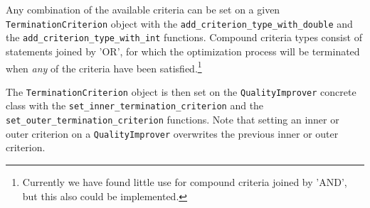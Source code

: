 Any combination of the available criteria can be set on a given
\texttt{TerminationCriterion} object with the \texttt{add\_criterion\_type\_with\_double} and 
the \texttt{add\_criterion\_type\_with\_int} functions.  Compound criteria types consist
of statements joined by 'OR', for which 
the optimization process will be terminated when {\it any} of
the criteria have been satisfied.\footnote{Currently we have found little use
for compound criteria joined by 'AND', but this also could be implemented.}

The \texttt{TerminationCriterion} object is then set on the \texttt{QualityImprover} concrete class
with the \texttt{set\_inner\_termination\_criterion} and the \texttt{set\_outer\_termination\_criterion}
functions. Note that setting an inner or outer criterion on a \texttt{QualityImprover} overwrites
the previous inner or outer criterion.

